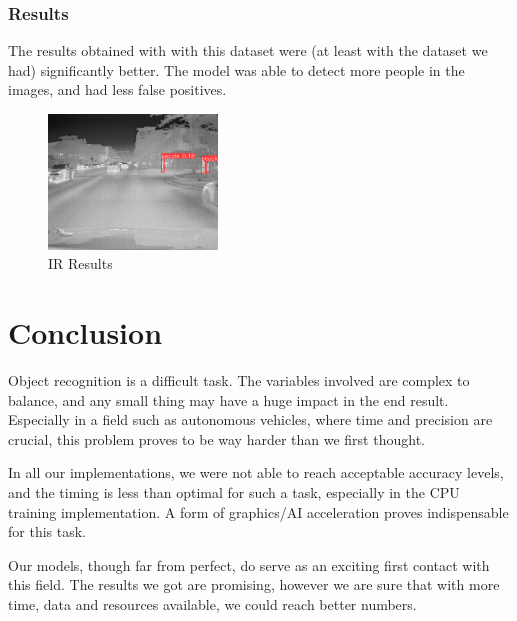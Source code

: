 \documentclass[conference]{IEEEtran}
\begin{document}
\subsubsection{Results}
The results obtained with with this dataset were (at least with the dataset we had) significantly better. The model was able to detect more people in the images, and had less false positives.

\begin{figure}[ht!]
    \centering
    \includegraphics[width=0.4\textwidth]{Images/ir_result.png}
    \caption{IR Results}\label{fig:ir-results}
\end{figure}

\section{Conclusion}
Object recognition is a difficult task. The variables involved are complex to balance, and any small thing may have a huge impact in the end result. Especially in a field such as autonomous vehicles, where time and precision are crucial, this problem proves to be way harder than we first thought.

In all our implementations, we were not able to reach acceptable accuracy levels, and the timing is less than optimal for such a task, especially in the CPU training implementation. A form of graphics/AI acceleration proves indispensable for this task.

Our models, though far from perfect, do serve as an exciting first contact with this field. The results we got are promising, however we are sure that with more time, data and resources available, we could reach better numbers.
\end{document}
